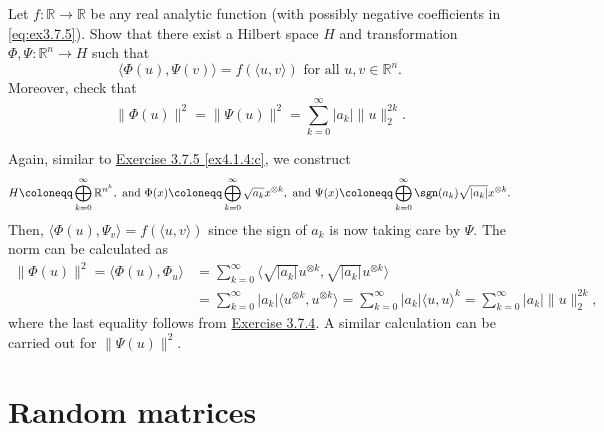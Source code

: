 \begin{problem*}[Exercise 3.7.6]\label{ex3.7.6}
	Let \(f \colon \mathbb{R} \to \mathbb{R} \) be any real analytic function (with possibly negative coefficients in \autoref{eq:ex3.7.5}). Show that there exist a Hilbert space \(H\) and transformation \(\Phi , \Psi \colon \mathbb{R} ^n \to H\) such that
	\[
		\langle \Phi (u), \Psi (v) \rangle
		= f(\langle u, v \rangle )
		\text{ for all } u, v \in \mathbb{R} ^n.
	\]
	Moreover,  check that
	\[
		\lVert \Phi (u) \rVert ^2
		= \lVert \Psi (u) \rVert ^2
		= \sum_{k=0}^{\infty} \lvert a_k \rvert \lVert u \rVert _2^{2k}.
	\]
\end{problem*}
\begin{answer}
	Again, similar to \hyperref[ex3.7.5:c]{Exercise 3.7.5 \autoref{ex4.1.4:c}}, we construct
	\[
		H\coloneqq \bigoplus_{k=0}^{\infty} \mathbb{R} ^{n^k}, \text{ and }
		\Phi (x) \coloneqq \bigoplus_{k=0}^{\infty} \sqrt{a_k} x^{\otimes k}, \text{ and }
		\Psi (x) \coloneqq \bigoplus_{k=0}^{\infty} \sgn (a_k) \sqrt{\lvert a_k \rvert } x^{\otimes k}.
	\]
	Then, \(\langle \Phi (u), \Psi _v \rangle = f(\langle u, v \rangle )\) since the sign of \(a_k\) is now taking care by \(\Psi \). The norm can be calculated as
	\[
		\begin{split}
			\lVert \Phi (u) \rVert ^2 = \langle \Phi (u), \Phi _u \rangle
			 & = \sum_{k=0}^{\infty} \langle \sqrt{\lvert a_k \rvert } u^{\otimes k} , \sqrt{\lvert a_k \rvert } u^{\otimes k} \rangle \\
			 & = \sum_{k=0}^{\infty} \lvert a_k \rvert \langle u^{\otimes k}, u^{\otimes k} \rangle
			= \sum_{k=0}^{\infty} \lvert a_k \rvert \langle u, u \rangle ^k
			= \sum_{k=0}^{\infty} \lvert a_k \rvert \lVert u \rVert _2^{2k},
		\end{split}
	\]
	where the last equality follows from \hyperref[ex3.7.4]{Exercise 3.7.4}. A similar calculation can be carried out for \(\lVert \Psi (u) \rVert ^2\).
\end{answer}

\chapter{Random matrices}
